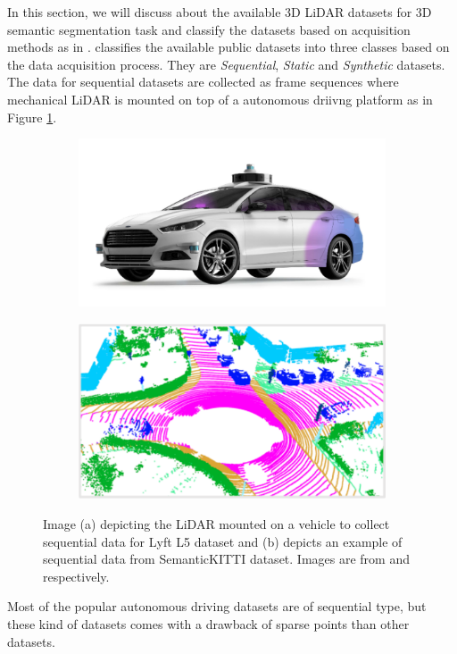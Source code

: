     In this section, we will discuss about the available 3D LiDAR datasets for 3D semantic segmentation task and classify the datasets based on acquisition methods as in \cite{survey3d}.
    \cite{survey3d} classifies the available public datasets into three classes based on the data acquisition process.
    They are \textit{Sequential}, \textit{Static} and \textit{Synthetic} datasets.
    The data for sequential datasets are collected as frame sequences where mechanical LiDAR is mounted on top of a autonomous driivng platform as in Figure \ref{fig:seq_data_lyft}.
    \begin{figure}[h!]
        \begin{subfigure}{0.45\textwidth}
            \centering
            \includegraphics[scale=0.25]{images/sequential_lyft.png}
            \caption{}
        \end{subfigure}
        \begin{subfigure}{0.45\textwidth}
            \centering
            \includegraphics[scale=0.45]{images/SemanticKitti.pdf}
            \caption{}
        \end{subfigure}
        \caption{Image (a) depicting the LiDAR mounted on a vehicle to collect sequential data for Lyft L5 dataset and 
        (b) depicts an example of sequential data from SemanticKITTI dataset. Images are from \cite{Lyftl5} and \cite{Hu_2020_CVPR_Randla} respectively.}
        \label{fig:seq_data_lyft}
    \end{figure}
    Most of the popular autonomous driving datasets are of sequential type, but these kind of datasets comes with a drawback of sparse points than other datasets.
    
